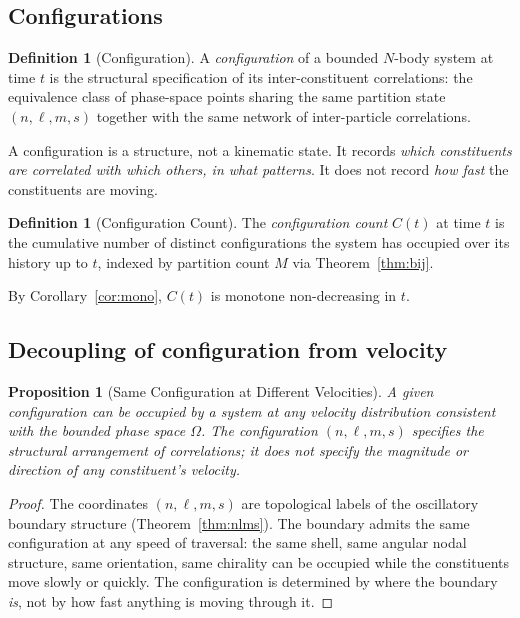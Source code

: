 \documentclass[twocolumn,10pt,a4paper]{article}
\theoremstyle{thmstyle}
\newtheorem{proposition}[theorem]{Proposition}
\theoremstyle{definition}
\newtheorem{definition}[theorem]{Definition}
\theoremstyle{remark}
\begin{document}
\subsection{Configurations}

\begin{definition}[Configuration]
\label{def:config}
A \emph{configuration} of a bounded $N$-body system at time $t$ is
the structural specification of its inter-constituent correlations:
the equivalence class of phase-space points sharing the same
partition state $(n,\ell,m,s)$ together with the same network of
inter-particle correlations.
\end{definition}

A configuration is a structure, not a kinematic state. It records
\emph{which constituents are correlated with which others, in what
patterns}. It does not record \emph{how fast} the constituents are
moving.

\begin{definition}[Configuration Count]
\label{def:Cc}
The \emph{configuration count} $C(t)$ at time $t$ is the cumulative
number of distinct configurations the system has occupied over its
history up to $t$, indexed by partition count $M$ via
Theorem~\ref{thm:bij}.
\end{definition}

By Corollary~\ref{cor:mono}, $C(t)$ is monotone non-decreasing in $t$.

\subsection{Decoupling of configuration from velocity}

\begin{proposition}[Same Configuration at Different Velocities]
\label{prop:decouple}
A given configuration can be occupied by a system at any velocity
distribution consistent with the bounded phase space $\Omega$. The
configuration $(n,\ell,m,s)$ specifies the structural arrangement of
correlations; it does not specify the magnitude or direction of any
constituent's velocity.
\end{proposition}

\begin{proof}
The coordinates $(n,\ell,m,s)$ are topological labels of the
oscillatory boundary structure (Theorem~\ref{thm:nlms}). The boundary
admits the same configuration at any speed of traversal: the same
shell, same angular nodal structure, same orientation, same chirality
can be occupied while the constituents move slowly or quickly. The
configuration is determined by where the boundary \emph{is}, not by
how fast anything is moving through it.
\end{proof}
\end{document}
